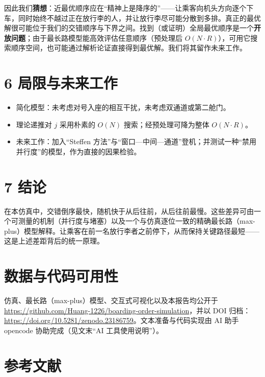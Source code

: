 \documentclass[
  11pt,
  UTF8,
  fontset=windows]{ctexart}
\providecommand{\tightlist}{%
  \setlength{\itemsep}{0pt}\setlength{\parskip}{0pt}}
\begin{document}
因此我们\textbf{猜想}：近最优顺序应在``精神上是降序的''------让乘客向机头方向逐个下车，同时始终不越过正在放行李的人，并让放行李尽可能分散到多排。真正的最优解很可能位于我们的交错顺序与下界之间。找到（或证明）全局最优顺序是一个\textbf{开放问题}；由于最长路模型能高效评估任意顺序（预处理后
\(O(N\cdot R)\)），可用它搜索顺序空间，也可能通过解析论证直接得到最优解。我们将其留作未来工作。

\section{6
局限与未来工作}\label{ux5c40ux9650ux4e0eux672aux6765ux5de5ux4f5c}

\begin{itemize}
\tightlist
\item
  简化模型：未考虑对号入座的相互干扰，未考虑双通道或第二舱门。
\item
  理论递推对 \(j\) 采用朴素的 \(O(N)\) 搜索；经预处理可降为整体
  \(O(N\cdot R)\)。
\item
  未来工作：加入``Steffen
  方法''与``窗口---中间---通道''登机；并测试一种``禁用并行度''的模型，作为直接的因果检验。
\end{itemize}

\section{7 结论}\label{ux7ed3ux8bba}

在本仿真中，交错倒序最快，随机快于从后往前，从后往前最慢。这些差异可由一个可测量的机制（并行度与堵塞）以及一个与仿真逐位一致的精确最长路（max-plus）模型解释。让乘客在前一名放行李者之前停下，从而保持关键路径最短------这是上述差距背后的统一原理。

\section{数据与代码可用性}\label{ux6570ux636eux4e0eux4ee3ux7801ux53efux7528ux6027}

仿真、最长路（max-plus）模型、交互式可视化以及本报告均公开于
\url{https://github.com/Huang-1226/boarding-order-simulation}，并以 DOI
归档：\url{https://doi.org/10.5281/zenodo.23186759}。文本准备与代码实现由
AI 助手 opencode 协助完成（见文末``AI 工具使用说明''）。

\section{参考文献}\label{ux53c2ux8003ux6587ux732e}
\end{document}
